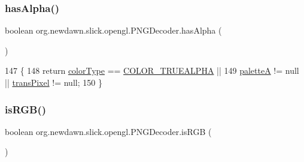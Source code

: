 \subsubsection{\texorpdfstring{has\+Alpha()}{hasAlpha()}}
{\footnotesize\ttfamily boolean org.\+newdawn.\+slick.\+opengl.\+P\+N\+G\+Decoder.\+has\+Alpha (\begin{DoxyParamCaption}{ }\end{DoxyParamCaption})\hspace{0.3cm}{\ttfamily [inline]}}


\begin{DoxyCode}
147                               \{
148         \textcolor{keywordflow}{return} \mbox{\hyperlink{classorg_1_1newdawn_1_1slick_1_1opengl_1_1_p_n_g_decoder_a01a4bfaf3046e4b6eb944e7d48eb31c3}{colorType}} == \mbox{\hyperlink{classorg_1_1newdawn_1_1slick_1_1opengl_1_1_p_n_g_decoder_a96c509f7243118174cd8d25c50314713}{COLOR\_TRUEALPHA}} ||
149                 \mbox{\hyperlink{classorg_1_1newdawn_1_1slick_1_1opengl_1_1_p_n_g_decoder_a273b1728dfd1158eb001f98fd4255a58}{paletteA}} != null || \mbox{\hyperlink{classorg_1_1newdawn_1_1slick_1_1opengl_1_1_p_n_g_decoder_ad3c546cf013c0c8bdee84a07fdc08389}{transPixel}} != null;
150     \}
\end{DoxyCode}
\mbox{\label{classorg_1_1newdawn_1_1slick_1_1opengl_1_1_p_n_g_decoder_a04a6ed620e9af0576fc0ba93d418f017}} 
\subsubsection{\texorpdfstring{is\+R\+G\+B()}{isRGB()}}
{\footnotesize\ttfamily boolean org.\+newdawn.\+slick.\+opengl.\+P\+N\+G\+Decoder.\+is\+R\+GB (\begin{DoxyParamCaption}{ }\end{DoxyParamCaption})\hspace{0.3cm}{\ttfamily [inline]}}


